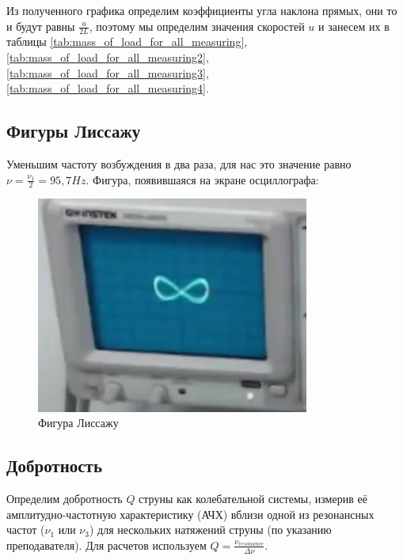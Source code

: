 \documentclass[13pt,a4paper]{article}
\begin{document}
	Из полученного графика определим коэффициенты угла наклона прямых, они то и будут равны $\frac{u}{2L}$, поэтому мы определим значения скоростей $u$ и занесем их в таблицы \ref{tab:mass_of_load_for_all_measuring},  \ref{tab:mass_of_load_for_all_measuring2}, \ref{tab:mass_of_load_for_all_measuring3}, \ref{tab:mass_of_load_for_all_measuring4}.
\newpage


\subsection{Фигуры Лиссажу}
Уменьшим частоту возбуждения в два раза, для нас это значение равно $\nu=\frac{\nu_{1}}{2}=95,7 Hz$. Фигура, появившаяся на экране осциллографа:
\begin{figure}[h!]
	\begin{center}
		\includegraphics[width = 0.8\textwidth]{lissajous}
		\caption{Фигура Лиссажу}
		\label{fig:u2t}
	\end{center}
\end{figure}

\subsection{Добротность}
Определим добротность $Q$ струны как колебательной системы, измерив её амплитудно-частотную характеристику (АЧХ) вблизи одной из резонансных частот ($\nu_{1}$ или $\nu_{3}$) для нескольких натяжений струны (по указанию преподавателя).
Для расчетов используем $Q=\frac{\nu_{resonance}}{\Delta\nu}$.
\end{document}
